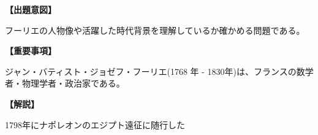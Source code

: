 \noindent \textbf{【出題意図】}

\noindent フーリエの人物像や活躍した時代背景を理解しているか確かめる問題である。

\vspace{1em}
\noindent \textbf{【重要事項】}

ジャン・バティスト・ジョゼフ・フーリエ(1768 年 - 1830年)は、フランスの数学者・物理学者・政治家である。

\vspace{1em}
\noindent \textbf{【解説】}

\noindent 1798年にナポレオンのエジプト遠征に随行した
